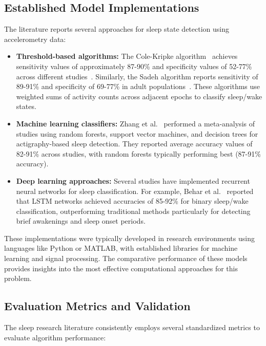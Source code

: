 \documentclass[conference]{IEEEtran}
\begin{document}
\subsection{Established Model Implementations}
\label{sec:model_implementation}
The literature reports several approaches for sleep state detection using accelerometry data:

\begin{itemize}
	\item \textbf{Threshold-based algorithms:} The Cole-Kripke algorithm~\cite{cole1992automatic} achieves sensitivity values of approximately 87-90\% and specificity values of 52-77\% across different studies~\cite{sadeh2011, vanHees2015}. Similarly, the Sadeh algorithm reports sensitivity of 89-91\% and specificity of 69-77\% in adult populations~\cite{sadeh2011}. These algorithms use weighted sums of activity counts across adjacent epochs to classify sleep/wake states.

	\item \textbf{Machine learning classifiers:} Zhang et al.~\cite{zhang2020machine} performed a meta-analysis of studies using random forests, support vector machines, and decision trees for actigraphy-based sleep detection. They reported average accuracy values of 82-91\% across studies, with random forests typically performing best (87-91\% accuracy).

	\item \textbf{Deep learning approaches:} Several studies have implemented recurrent neural networks for sleep classification. For example, Behar et al.~\cite{behar2013} reported that LSTM networks achieved accuracies of 85-92\% for binary sleep/wake classification, outperforming traditional methods particularly for detecting brief awakenings and sleep onset periods.
\end{itemize}

These implementations were typically developed in research environments using languages like Python or MATLAB, with established libraries for machine learning and signal processing. The comparative performance of these models provides insights into the most effective computational approaches for this problem.

\subsection{Evaluation Metrics and Validation}
The sleep research literature consistently employs several standardized metrics to evaluate algorithm performance:
\end{document}
